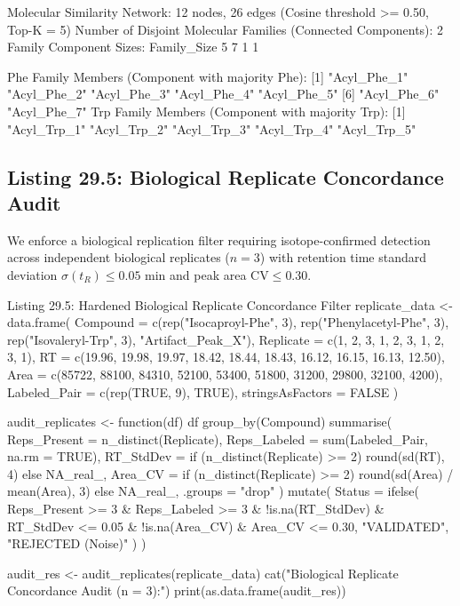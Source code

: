\documentclass[11pt,twoside,openright]{book}
\begin{document}
\begin{routput}
Molecular Similarity Network: 12 nodes, 26 edges (Cosine threshold >= 0.50, Top-K = 5)
Number of Disjoint Molecular Families (Connected Components): 2
Family Component Sizes:
Family\_Size
5 7 
1 1 

Phe Family Members (Component with majority Phe):
{}[1] "Acyl\_Phe\_1" "Acyl\_Phe\_2" "Acyl\_Phe\_3" "Acyl\_Phe\_4" "Acyl\_Phe\_5"
{}[6] "Acyl\_Phe\_6" "Acyl\_Phe\_7"
Trp Family Members (Component with majority Trp):
{}[1] "Acyl\_Trp\_1" "Acyl\_Trp\_2" "Acyl\_Trp\_3" "Acyl\_Trp\_4" "Acyl\_Trp\_5"
\end{routput}

\subsection{Listing 29.5: Biological Replicate Concordance Audit}

We enforce a biological replication filter requiring isotope-confirmed detection across independent biological replicates ($n=3$) with retention time standard deviation $\sigma(t_R) \le 0.05$ min and peak area $\text{CV} \le 0.30$.

\begin{rchunk}{Listing 29.5: Hardened Biological Replicate Concordance Filter}
replicate_data <- data.frame(
  Compound     = c(rep("Isocaproyl-Phe", 3), rep("Phenylacetyl-Phe", 3),
                   rep("Isovaleryl-Trp", 3), "Artifact_Peak_X"),
  Replicate    = c(1, 2, 3, 1, 2, 3, 1, 2, 3, 1),
  RT           = c(19.96, 19.98, 19.97, 18.42, 18.44, 18.43, 16.12, 16.15, 16.13, 12.50),
  Area         = c(85722, 88100, 84310, 52100, 53400, 51800, 31200, 29800, 32100, 4200),
  Labeled_Pair = c(rep(TRUE, 9), TRUE),
  stringsAsFactors = FALSE
)

audit_replicates <- function(df) {
  df %
    group_by(Compound) %
    summarise(
      Reps_Present = n_distinct(Replicate),
      Reps_Labeled = sum(Labeled_Pair, na.rm = TRUE),
      RT_StdDev    = if (n_distinct(Replicate) >= 2) round(sd(RT), 4) else NA_real_,
      Area_CV      = if (n_distinct(Replicate) >= 2) round(sd(Area) / mean(Area), 3) else NA_real_,
      .groups      = "drop"
    ) %
    mutate(
      Status = ifelse(
        Reps_Present >= 3 & Reps_Labeled >= 3 &
          !is.na(RT_StdDev) & RT_StdDev <= 0.05 &
          !is.na(Area_CV) & Area_CV <= 0.30,
        "VALIDATED", "REJECTED (Noise)"
      )
    )
}

audit_res <- audit_replicates(replicate_data)
cat("Biological Replicate Concordance Audit (n = 3):\n")
print(as.data.frame(audit_res))
\end{rchunk}
\end{document}
